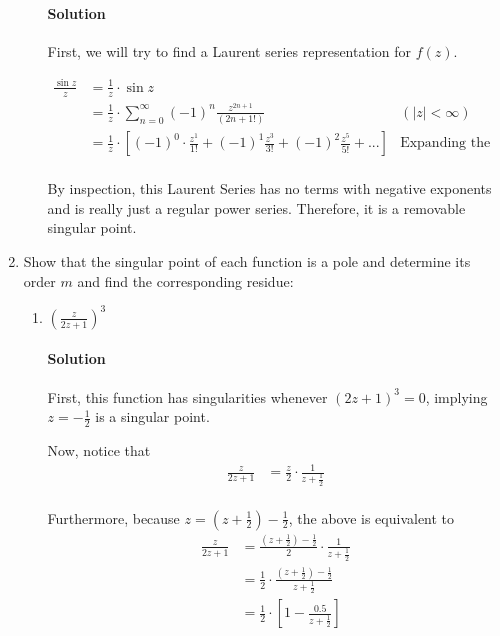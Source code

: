 \documentclass[11pt]{article}
\begin{document}
\begin{enumerate}
\begin{enumerate}
			\paragraph{Solution}
			First, we will try to find a Laurent series representation for $f(z)$.
			
			\[\begin{aligned}
			\frac{\sin{z}}{z}
			&= \frac{1}{z} \cdot \sin{z} \\
			&= \frac{1}{z} \cdot \sum^{\infty}_{n=0} (-1)^n \frac{z^{2n + 1}}{(2n + 1!)}
			& (|z| < \infty) \\
			&= \frac{1}{z} \cdot [(-1)^0 \cdot \frac{z^1}{1!} +
				(-1)^1 \frac{z^3}{3!} + (-1)^2\frac{z^5}{5!} + ...] & \text{Expanding the series} \\
			\end{aligned}\]
			
			By inspection, this Laurent Series has no terms with negative exponents and is really just a regular power series. Therefore, it is a removable singular point.			
		\end{enumerate}
		
	\item Show that the singular point of each function is a pole and determine its order $m$ and find the corresponding residue:
		\begin{enumerate}
			\item $(\frac{z}{2z + 1})^3$
			\paragraph{Solution}
			First, this function has singularities whenever $(2z + 1)^3 = 0$, implying $z = -\frac{1}{2}$ is a singular point.
			
			Now, notice that
			\[\begin{aligned}
			\frac{z}{2z + 1}
			&= \frac{z}{2} \cdot \frac{1}{z + \frac{1}{2}} \\
			\end{aligned}\]
			
			Furthermore, because $z = (z + \frac{1}{2}) - \frac{1}{2}$, the above is equivalent to
			\[\begin{aligned}
			\frac{z}{2z + 1}
			&= \frac{(z + \frac{1}{2}) - \frac{1}{2}}{2} \cdot
				\frac{1}{z + \frac{1}{2}} \\
			&= \frac{1}{2} \cdot \frac{
				(z + \frac{1}{2}) - \frac{1}{2}}{
				z + \frac{1}{2}} \\
			&= \frac{1}{2} \cdot [1 - \frac{0.5}{z + \frac{1}{2}}] \\
			\end{aligned}\]
			

\end{enumerate}
\end{enumerate}
\end{document}
